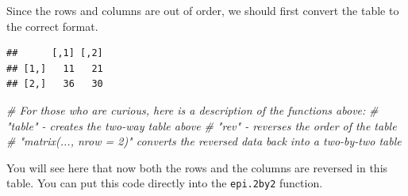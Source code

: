 \documentclass[]{book}
\newenvironment{Shaded}{\begin{snugshade}}{\end{snugshade}}
\newcommand{\CommentTok}[1]{\textcolor[rgb]{0.56,0.35,0.01}{\textit{#1}}}
\newcommand{\DataTypeTok}[1]{\textcolor[rgb]{0.13,0.29,0.53}{#1}}
\newcommand{\DecValTok}[1]{\textcolor[rgb]{0.00,0.00,0.81}{#1}}
\newcommand{\KeywordTok}[1]{\textcolor[rgb]{0.13,0.29,0.53}{\textbf{#1}}}
\newcommand{\NormalTok}[1]{#1}
\newcommand{\OperatorTok}[1]{\textcolor[rgb]{0.81,0.36,0.00}{\textbf{#1}}}
\begin{document}
Since the rows and columns are out of order, we should first convert the
table to the correct format.

\begin{Shaded}
\end{Shaded}

\begin{verbatim}
##      [,1] [,2]
## [1,]   11   21
## [2,]   36   30
\end{verbatim}

\begin{Shaded}
\begin{Highlighting}[]
\CommentTok{# For those who are curious, here is a description of the functions above:}
\CommentTok{# "table" - creates the two-way table above}
\CommentTok{# "rev" - reverses the order of the table}
\CommentTok{# "matrix(..., nrow = 2)" converts the reversed data back into a two-by-two table}
\end{Highlighting}
\end{Shaded}

You will see here that now both the rows and the columns are reversed in
this table. You can put this code directly into the \texttt{epi.2by2}
function.

\begin{Shaded}
\end{Shaded}
\end{document}
